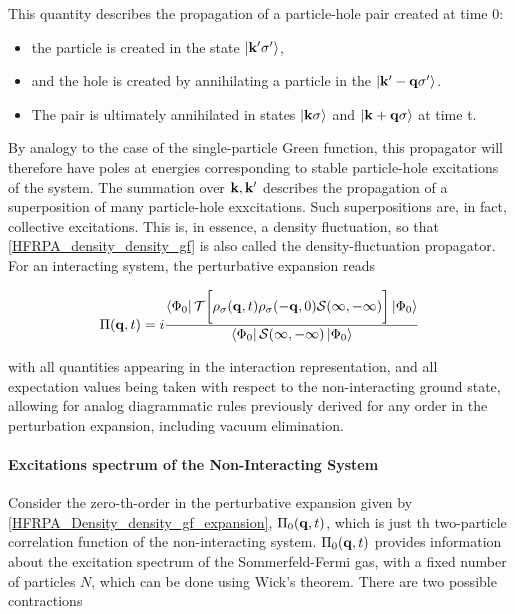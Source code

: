 This quantity describes the propagation of a particle-hole pair created at time 0: 

\begin{itemize}
    \item the particle is created in the state $\ket{{\bf k'} \sigma'}$,
    \item and the hole is created by annihilating a particle in the $\ket{{\bf k' - q} \sigma'}$.
    \item The pair is ultimately annihilated in states $\ket{{\bf k} \sigma}$ and $\ket{{\bf k +q} \sigma}$ at time t. 
\end{itemize}

By analogy to the case of the single-particle Green function, this propagator will therefore have poles at energies corresponding to stable particle-hole excitations of the system. The summation over ${\bf k}, {\bf k'}$ describes the propagation of a superposition of many particle-hole exxcitations. Such superpositions are, in fact, collective excitations. This is, in essence, a density fluctuation, so that \cref{HFRPA_density_density_gf} is also called the density-fluctuation propagator. For an interacting system, the perturbative expansion reads

\begin{equation}
    \Pi({\bf q},t) = i \frac{\bra{\Phi_0} \mathcal{T} \bigg[ \rho_{\sigma}({\bf q},t) \rho_{\sigma}(-{\bf q},0)\mathcal{S}(\infty, -\infty) \bigg] \ket{\Phi_0}}{\bra{\Phi_0} \mathcal{S}(\infty, -\infty) \ket{\Phi_0}}
    \label{HFRPA_Density_density_gf_expansion}
\end{equation}

with all quantities appearing in the interaction representation, and all expectation values being taken with respect to the non-interacting ground state, allowing for analog diagrammatic rules previously derived for any order in the perturbation expansion, including vacuum elimination. \\

\paragraph{Excitations spectrum of the Non-Interacting System}

Consider the zero-th-order in the perturbative expansion given by \cref{HFRPA_Density_density_gf_expansion}, $\Pi_0({\bf q}, t)$, which is just th two-particle correlation function of the non-interacting system. $\Pi_0({\bf q}, t)$ provides information about the excitation spectrum of the Sommerfeld-Fermi gas, with a fixed number of particles $N$, which can be done using Wick's theorem. There are two possible contractions 

